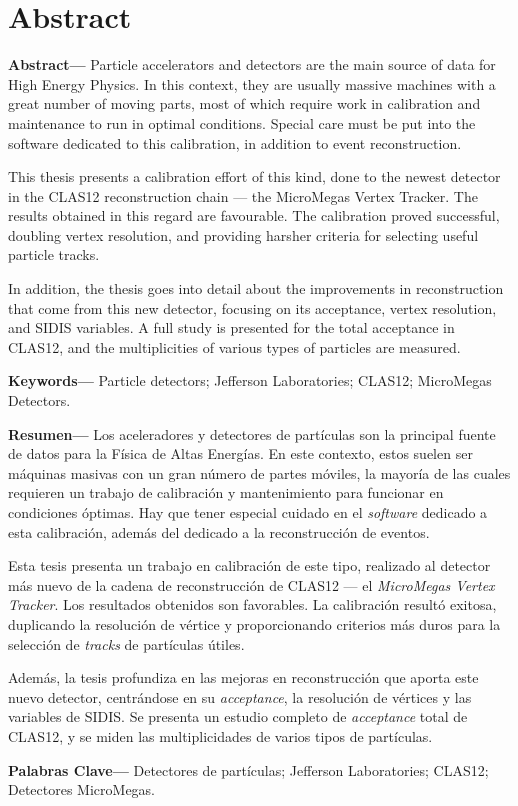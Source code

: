 \section*{Abstract}
    \noindent \textbf{Abstract---}
        Particle accelerators and detectors are the main source of data for High Energy Physics.
        In this context, they are usually massive machines with a great number of moving parts, most of which require work in calibration and maintenance to run in optimal conditions.
        Special care must be put into the software dedicated to this calibration, in addition to event reconstruction.

        This thesis presents a calibration effort of this kind, done to the newest detector in the CLAS12 reconstruction chain --- the MicroMegas Vertex Tracker.
        The results obtained in this regard are favourable.
        The calibration proved successful, doubling vertex resolution, and providing harsher criteria for selecting useful particle tracks.

        In addition, the thesis goes into detail about the improvements in reconstruction that come from this new detector, focusing on its acceptance, vertex resolution, and SIDIS variables.
        A full study is presented for the total acceptance in CLAS12, and the multiplicities of various types of particles are measured.

    \noindent \textbf{Keywords---}
        Particle detectors; Jefferson Laboratories; CLAS12; MicroMegas Detectors.

    \vspace{1.0cm}

    \noindent \textbf{Resumen---}
        Los aceleradores y detectores de partículas son la principal fuente de datos para la Física de Altas Energías.
        En este contexto, estos suelen ser máquinas masivas con un gran número de partes móviles, la mayoría de las cuales requieren un trabajo de calibración y mantenimiento para funcionar en condiciones óptimas.
        Hay que tener especial cuidado en el \textit{software} dedicado a esta calibración, además del dedicado a la reconstrucción de eventos.

        Esta tesis presenta un trabajo en calibración de este tipo, realizado al detector más nuevo de la cadena de reconstrucción de CLAS12 --- el \textit{MicroMegas Vertex Tracker}.
        Los resultados obtenidos son favorables.
        La calibración resultó exitosa, duplicando la resolución de vértice y proporcionando criterios más duros para la selección de \textit{tracks} de partículas útiles.

        Además, la tesis profundiza en las mejoras en reconstrucción que aporta este nuevo detector, centrándose en su \textit{acceptance}, la resolución de vértices y las variables de SIDIS.
        Se presenta un estudio completo de \textit{acceptance} total de CLAS12, y se miden las multiplicidades de varios tipos de partículas.

    \noindent \textbf{Palabras Clave---}
        Detectores de partículas; Jefferson Laboratories; CLAS12; Detectores MicroMegas.
